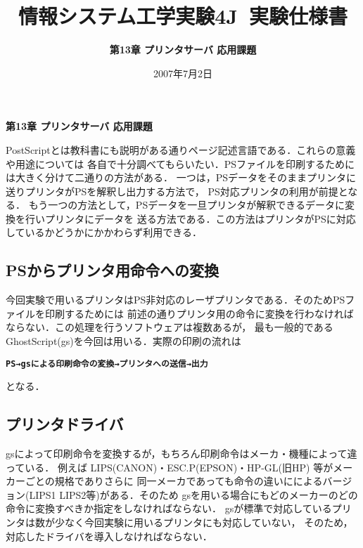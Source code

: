 \documentclass[a4j]{jarticle}
\title{\large{情報システム工学実験4J~実験仕様書}}
\author{\LARGE{\bf 第13章 プリンタサーバ 応用課題}}
\date{2007年7月2日}
\begin{document}
\thispagestyle{empty}
\begin{center}
\LARGE{\bf 第13章 プリンタサーバ 応用課題}
\end{center}
\vspace{1zh}

PostScriptとは教科書にも説明がある通りページ記述言語である．これらの意義や用途については
各自で十分調べてもらいたい．PSファイルを印刷するためには大きく分けて二通りの方法がある．
一つは，PSデータをそのままプリンタに送りプリンタがPSを解釈し出力する方法で，
PS対応プリンタの利用が前提となる．
もう一つの方法として，PSデータを一旦プリンタが解釈できるデータに変換を行いプリンタにデータを
送る方法である．この方法はプリンタがPSに対応しているかどうかにかかわらず利用できる．
\subsection*{PSからプリンタ用命令への変換}
今回実験で用いるプリンタはPS非対応のレーザプリンタである．そのためPSファイルを印刷するためには
前述の通りプリンタ用の命令に変換を行わなければならない．この処理を行うソフトウェアは複数あるが，
最も一般的であるGhostScript(gs)を今回は用いる．実際の印刷の流れは
\begin{center}
\begin{breakbox}
\begin{alltt}
\bf{PS → gsによる印刷命令の変換 → プリンタへの送信 → 出力}
\end{alltt}
\end{breakbox}
\end{center}
となる．
\subsection*{プリンタドライバ}
gsによって印刷命令を変換するが，もちろん印刷命令はメーカ・機種によって違っている．
例えば LIPS(CANON)・ESC.P(EPSON)・HP-GL(旧HP) 等がメーカーごとの規格でありさらに
同一メーカであっても命令の違いにによるバージョン(LIPS1 LIPS2等)がある．そのため
gsを用いる場合にもどのメーカーのどの命令に変換すべきか指定をしなければならない．
gsが標準で対応しているプリンタは数が少なく今回実験に用いるプリンタにも対応していない，
そのため，対応したドライバを導入しなければならない．
\end{document}
